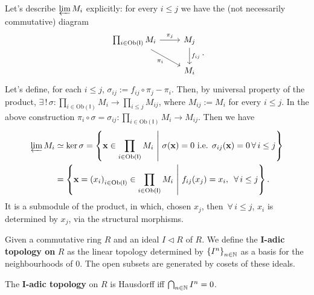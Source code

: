\begin{ex}
	Let's describe $\varprojlim M_i$ explicitly: for every $i \leq j$ we have the (not necessarily commutative) diagram
	\begin{equation}
	\begin{tikzcd}
		\prod_{i \in \mathrm{Ob} \left(\mathsf{I}\right)} M_i \arrow[r, "\pi_j", rightarrow] \arrow[rd, "\pi_i"', rightarrow] &
		M_j \arrow[d, "f_{ij}", rightarrow] \\
		& M_i
	\end{tikzcd} 
	.\end{equation}
	Let's define, for each $i \leq j$, $\sigma_{ij} := f_{ij} \circ\pi_j - \pi_i$.
	Then, by universal property of the product,
	$\exists\, !\, \sigma: \prod_{i \in \mathrm{Ob} \left(\mathsf{I}\right)} M_i \to \prod_{i \leq j} M_{ij}$,
	where $M_{ij} := M_i$ for every $i \leq j$.
	In the above construction $\pi_i \circ\sigma = \sigma_{ij}: \prod_{i \in \mathrm{Ob} \left(\mathsf{I}\right)} M_i \to M_{ij}$.
	Then we have
	\begin{align}
		\varprojlim M_i &\simeq \ker \sigma =
		\left\{ \mathbf{x} \in \prod_{i \in \mathrm{Ob} \left(\mathsf{I}\right)}
			M_i \ \middle|\ \sigma(\mathbf{x}) = 0
		\text{ i.e. } \sigma_{ij}(\mathbf{x}) =0 \,\forall\, i \leq j \right\} \\
				&=
		\left\{ \mathbf{x} = \left( x_i \right)_{i \in \mathrm{Ob} \left(\mathsf{I}\right)} \in
		\prod_{i \in \mathrm{Ob} \left(\mathsf{I}\right)} M_i \ \middle|\ 
		f_{ij}(x_j) = x_i, \ \,\forall\, i \leq j \right\}
	.\end{align} 
	It is a submodule of the product, in which, chosen $x_j$, then $\,\forall\, i \leq j$, $x_i$ is determined by $x_j$, via the structural morphisms.
\end{ex} 

\begin{defn}
	Given a commutative ring $R$ and an ideal $I \triangleleft R$ of $R$.
	We define the \textbf{$\mathbf{I}$-adic topology on} $R$ as the linear topology determined by
	$\left\{ I^n \right\}_{n \in \mathbb{N}}$ as a basis for the neighbourhoods of $0$.
	The open subsets are generated by cosets of these ideals.
\end{defn}

\begin{rem}
	The \textbf{$\mathbf{I}$-adic topology} on $R$ is Hausdorff iff $\bigcap_{n \in \mathbb{N}} I^n = 0$.
\end{rem} 

